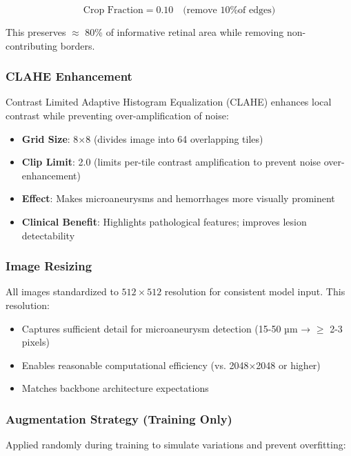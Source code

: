\documentclass[12pt,a4paper]{article}
\begin{document}
\begin{equation}
\text{Crop Fraction} = 0.10 \quad \text{(remove 10\% of edges)}
\end{equation}

This preserves $\approx$ 80\% of informative retinal area while removing non-contributing borders.

\subsubsection{CLAHE Enhancement}

Contrast Limited Adaptive Histogram Equalization (CLAHE) enhances local contrast while preventing over-amplification of noise:

\begin{itemize}
    \item \textbf{Grid Size}: 8×8 (divides image into 64 overlapping tiles)
    \item \textbf{Clip Limit}: 2.0 (limits per-tile contrast amplification to prevent noise over-enhancement)
    \item \textbf{Effect}: Makes microaneurysms and hemorrhages more visually prominent
    \item \textbf{Clinical Benefit}: Highlights pathological features; improves lesion detectability
\end{itemize}

\subsubsection{Image Resizing}

All images standardized to $512 \times 512$ resolution for consistent model input. This resolution:
\begin{itemize}
    \item Captures sufficient detail for microaneurysm detection (15-50 µm → $\geq$ 2-3 pixels)
    \item Enables reasonable computational efficiency (vs. 2048×2048 or higher)
    \item Matches backbone architecture expectations
\end{itemize}

\subsubsection{Augmentation Strategy (Training Only)}

Applied randomly during training to simulate variations and prevent overfitting:
\end{document}
